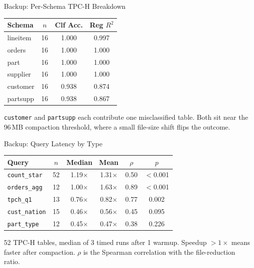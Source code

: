 \documentclass[aspectratio=169, 10pt]{beamer}
\begin{document}

\begin{frame}{Backup: Per-Schema TPC-H Breakdown}
\centering
\small
\begin{tabular}{lccc}
\toprule
Schema & $n$ & Clf Acc. & Reg $R^2$ \\
\midrule
lineitem & 16 & 1.000 & 0.997 \\
orders   & 16 & 1.000 & 1.000 \\
part     & 16 & 1.000 & 1.000 \\
supplier & 16 & 1.000 & 1.000 \\
customer & 16 & 0.938 & 0.874 \\
partsupp & 16 & 0.938 & 0.867 \\
\bottomrule
\end{tabular}
\vspace{1em}

\raggedright\small
\texttt{customer} and \texttt{partsupp} each contribute one
misclassified table. Both sit near the 96\,MB compaction
threshold, where a small file-size shift flips the outcome.
\end{frame}


\begin{frame}{Backup: Query Latency by Type}
\centering
\small
\begin{tabular}{lccccc}
\toprule
Query & $n$ & Median & Mean & $\rho$ & $p$ \\
\midrule
\texttt{count\_star}  & 52 & 1.19$\times$ & 1.31$\times$ & 0.50 & $<$0.001 \\
\texttt{orders\_agg}  & 12 & 1.00$\times$ & 1.63$\times$ & 0.89 & $<$0.001 \\
\texttt{tpch\_q1}     & 13 & 0.76$\times$ & 0.82$\times$ & 0.77 & 0.002 \\
\texttt{cust\_nation} & 15 & 0.46$\times$ & 0.56$\times$ & 0.45 & 0.095 \\
\texttt{part\_type}   & 12 & 0.45$\times$ & 0.47$\times$ & 0.38 & 0.226 \\
\bottomrule
\end{tabular}
\vspace{1em}

\raggedright\small
52 TPC-H tables, median of 3 timed runs after 1 warmup.
Speedup $> 1\times$ means faster after compaction.
$\rho$ is the Spearman correlation with the file-reduction ratio.
\end{frame}
\end{document}
